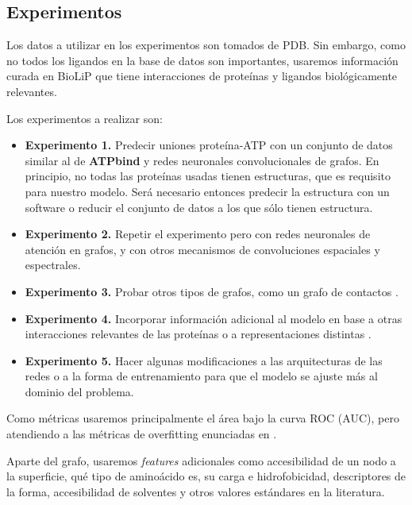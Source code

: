 \documentclass[
    left=2.0cm,         %
    right=2.0cm,        %
    top=2.0cm,          %
    bottom=2.5cm,         %
    bindingoffset=6mm,  %
    nohyphenation=false %
]{eiti/eiti-thesis}
\begin{document}
\subsection{Experimentos}\label{experimentos}

Los datos a utilizar en los experimentos son tomados de PDB. Sin embargo, como no
todos los ligandos en la base de datos son importantes, usaremos
información curada en BioLiP\cite{yang2012biolip} que tiene interacciones de proteínas y ligandos
biológicamente relevantes.

Los experimentos a realizar son:

\begin{itemize}
    \item \textbf{Experimento 1.} Predecir uniones proteína-ATP con un conjunto de datos similar al de \textbf{ATPbind}
    \cite{atpbind} y redes neuronales convolucionales de grafos. En principio, no todas las proteínas usadas tienen estructuras, que 
    es requisito para nuestro modelo. Será necesario entonces predecir la estructura con
    un software o reducir el conjunto de datos a los que sólo tienen estructura. 
    \item \textbf{Experimento 2.} Repetir el experimento pero con redes neuronales
    de atención en grafos, y con otros mecanismos de convoluciones espaciales y
    espectrales.
    \item \textbf{Experimento 3.} Probar otros tipos de grafos, como un grafo de
    contactos \cite{fout2017proteininterface}. 
    \item \textbf{Experimento 4.} Incorporar información adicional al modelo en base
    a otras interacciones relevantes de las proteínas \cite{yang2012biolip} o a
    representaciones distintas \cite{keiser2009newtargetsknowndrugs}.
    \item \textbf{Experimento 5.} Hacer algunas modificaciones a las arquitecturas
    de las redes o a la forma de entrenamiento para que el modelo se ajuste más
    al dominio del problema.
\end{itemize}

Como métricas usaremos principalmente el área bajo la curva ROC (AUC), pero atendiendo
a las métricas de overfitting enunciadas en \cite{wallach2018overfitting}.

Aparte del grafo, usaremos \textit{features} adicionales como accesibilidad de un nodo
a la superficie, qué tipo de aminoácido es, su carga e hidrofobicidad, descriptores de la
forma, accesibilidad de solventes y otros valores estándares en la literatura.
\end{document}
